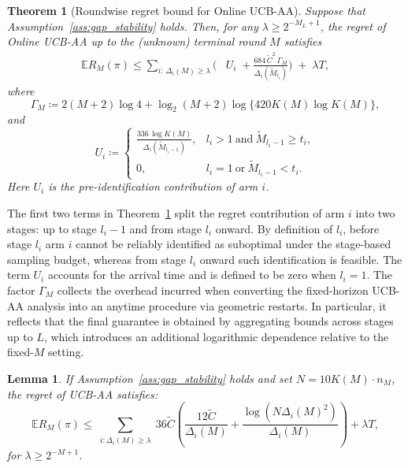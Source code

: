 \documentclass[11pt]{article}
\newtheorem{theorem}{Theorem}
\newtheorem{lemma}{Lemma}
\begin{document}
\begin{theorem}[Roundwise regret bound for Online UCB-AA]
\label{thm:online-ucb-aa-upper}
Suppose that Assumption~\ref{ass:gap_stability} holds. Then, for any
$\lambda \ge 2^{-M_L+1}$, the regret of Online UCB-AA up to the
(unknown) terminal round $M$ satisfies
\begin{align*}
\mathbb{E}R_M(\pi)
\le
\sum_{i:\,\Delta_i(M)\ge \lambda}
\Biggl(
&U_i
\;+\frac{684\,\tilde{C}^2\,\Gamma_M}{\Delta_i(\tilde{M}_{l_i})}
\Biggr)
\;+\;\lambda T,
\end{align*}
where
\[
\Gamma_M
\coloneqq
2(M+2)\log 4
+\log_2(M+2)\log\{420K(M)\log K(M)\},
\]
and
\[
U_i\coloneqq
\begin{cases}
\displaystyle
\frac{336\,\log K(M)}{\Delta_i(\tilde M_{l_i-1})},
& l_i>1\ \text{and}\ \tilde M_{l_i-1}\ge t_i,\\[1.2ex]
0, & l_i=1\ \text{or}\ \tilde M_{l_i-1}<t_i.
\end{cases}
\]
Here \(U_i\) is the pre-identification contribution of arm \(i\).
\end{theorem}


The first two terms in Theorem~\ref{thm:online-ucb-aa-upper} split the regret contribution of arm $i$ into two stages: up to stage $l_i-1$ and from stage $l_i$ onward. By definition of $l_i$, before stage $l_i$ arm $i$ cannot be reliably identified as suboptimal under the stage-based sampling budget, whereas from stage $l_i$ onward such identification is feasible. The term $U_i$ accounts for the arrival time and is defined to be zero when $l_i=1$. The factor $\Gamma_M$ collects the overhead incurred when converting the fixed-horizon UCB-AA analysis into an anytime procedure via geometric restarts. In particular, it reflects that the final guarantee is obtained by aggregating bounds across stages up to $L$, which introduces an additional logarithmic dependence relative to the fixed-$M$ setting.


\begin{lemma}
\label{lemma1 of online}
If Assumption~\ref{ass:gap_stability} holds and set  $N=10 K(M)\cdot n_M$, the regret of UCB-AA satisfies: 
\[\mathbb{E}R_M(\pi)\leq\sum_{\substack{i: \Delta_i(M) \geq \lambda}} 36\tilde{C}\left(\frac{12\tilde{C}}{\Delta_i(M)}+\frac{\log(N \Delta_i(M)^2)}{\Delta_i(M)}\right)+\lambda T,\]
for $\lambda\geq 2^{-M+1}$.
\end{lemma}
\end{document}
